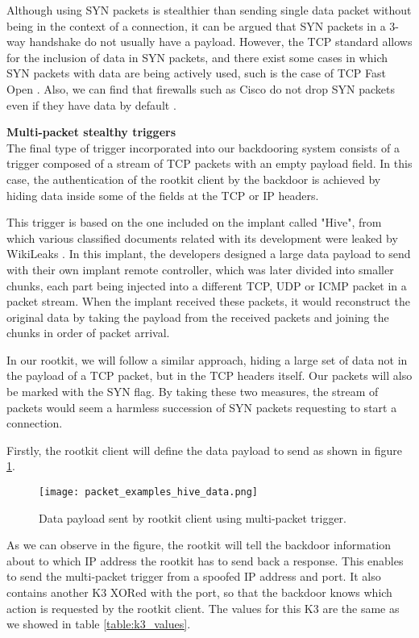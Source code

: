 Although using SYN packets is stealthier than sending single data packet without being in the context of a connection, it can be argued that SYN packets in a 3-way handshake do not usually have a payload. However, the TCP standard allows for the inclusion of data in SYN packets, and there exist some cases in which SYN packets with data are being actively used, such is the case of TCP Fast Open \cite{tcp_syn_payload} \cite{rfc_tcp4}. Also, we can find that firewalls such as Cisco do not drop SYN packets even if they have data by default \cite{cisco_syn_firewall}.


\textbf{Multi-packet stealthy triggers}\\
The final type of trigger incorporated into our backdooring system consists of a trigger composed of a stream of TCP packets with an empty payload field. In this case, the authentication of the rootkit client by the backdoor is achieved by hiding data inside some of the fields at the TCP or IP headers. 

This trigger is based on the one included on the implant called "Hive", from which various classified documents related with its development were leaked by WikiLeaks \cite{hive_implant}. In this implant, the developers designed a large data payload to send with their own implant remote controller, which was later divided into smaller chunks, each part being injected into a different TCP, UDP or ICMP packet in a packet stream. When the implant received these packets, it would reconstruct the original data by taking the payload from the received packets and joining the chunks in order of packet arrival.

In our rootkit, we will follow a similar approach, hiding a large set of data not in the payload of a TCP packet, but in the TCP headers itself. Our packets will also be marked with the SYN flag. By taking these two measures, the stream of packets would seem a harmless succession of SYN packets requesting to start a connection.

Firstly, the rootkit client will define the data payload to send as shown in figure \ref{fig:hive_data}.

\begin{figure}[htbp]
	\centering
	\texttt{[image: packet\_examples\_hive\_data.png]}
	\caption{Data payload sent by rootkit client using multi-packet trigger.}
	\label{fig:hive_data}
\end{figure}

As we can observe in the figure, the rootkit will tell the backdoor information about to which IP address the rootkit has to send back a response. This enables to send the multi-packet trigger from a spoofed IP address and port. It also contains another K3 XORed with the port, so that the backdoor knows which action is requested by the rootkit client. The values for this K3 are the same as we showed in table \ref{table:k3_values}.

